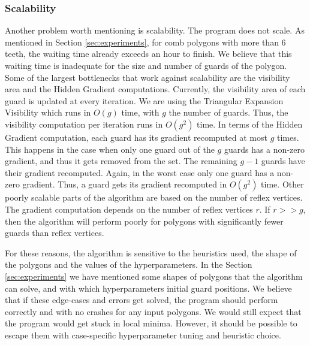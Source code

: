 \subsubsection*{Scalability}
Another problem worth mentioning is scalability. The program does not scale. As mentioned in Section \ref{sec:experiments}, for comb polygons with more than 6 teeth, the waiting time already exceeds an hour to finish. We believe that this waiting time is inadequate for the size and number of guards of the polygon.
Some of the largest bottlenecks that work against scalability are the visibility area and the Hidden Gradient computations. Currently, the visibility area of each guard is updated at every iteration. We are using the Triangular Expansion Visibility \cite{DBLP:journals/corr/BungiuHHHK14} which runs in $O(g)$ time, with $g$ the number of guards. Thus, the visibility computation per iteration runs in $O(g^2)$ time. 
In terms of the Hidden Gradient computation, each guard has its gradient recomputed at most $g$ times. This happens in the case when only one guard out of the $g$ guards has a non-zero gradient, and thus it gets removed from the set. The remaining $g - 1$ guards have their gradient recomputed. Again, in the worst case only one guard has a non-zero gradient. Thus, a guard gets its gradient recomputed in $O(g^2)$ time.
Other poorly scalable parts of the algorithm are based on the number of reflex vertices. The gradient computation depends on the number of reflex vertices $r$. If $r >> g$, then the algorithm will perform poorly for polygons with significantly fewer guards than reflex vertices.

For these reasons, the algorithm is sensitive to the heuristics used, the shape of the polygons and the values of the hyperparameters. In the Section \ref{sec:experiments} we have mentioned some shapes of polygons that the algorithm can solve, and with which hyperparameters initial guard positions.
We believe that if these edge-cases and errors get solved, the program should perform correctly and with no crashes for any input polygons. We would still expect that the program would get stuck in local minima. However, it should be possible to escape them with case-specific hyperparameter tuning and heuristic choice.





